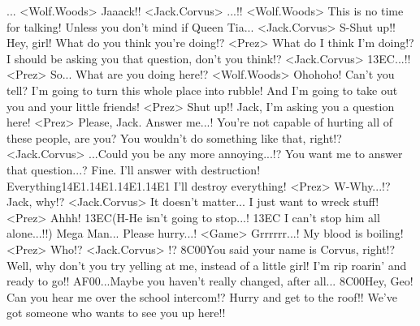 ... 
<Wolf.Woods> Jaaack!! 
<Jack.Corvus> ...!! 
<Wolf.Woods> This is no time for talking! 
Unless you don't mind if Queen Tia... 
<Jack.Corvus> S-Shut up!! 
Hey, girl! What do you think you're doing!? 
<Prez> What do I think I'm doing!? 
I should be asking you that question, don't you think!? 
<Jack.Corvus> {13}{EC}...!! 
<Prez> So... What are you doing here!? 
<Wolf.Woods> Ohohoho! 
Can't you tell? I'm going to turn this whole place into rubble! 
And I'm going to take out you and your little friends! 
<Prez> Shut up!! 
Jack, I'm asking you a question here! 
<Prez> Please, Jack. Answer me...! 
You're not capable of hurting all of these people, are you? 
You wouldn't do something like that, right!? 
<Jack.Corvus> ...Could you be any more annoying...!? 
You want me to answer that question...? 
Fine. 
I'll answer with destruction! 
Everything{14}{E1}.{14}{E1}.{14}{E1}.{14}{E1} I'll destroy everything! 
<Prez> W-Why...!? Jack, why!? 
<Jack.Corvus> It doesn't matter... 
I just want to wreck stuff! 
<Prez> Ahhh! 
{13}{EC}(H-He isn't going to stop...! {13}{EC} I can't stop him all alone...!!) 
Mega Man... 
Please hurry...! 
<Game> Grrrrrr...! My blood is boiling! 
<Prez> Who!? 
<Jack.Corvus> !? 
{8C}{00}You said your name is Corvus, right!? 
Well, why don't you try yelling at me, instead of a little girl! 
I'm rip roarin' and ready to go!! 
{AF}{00}...Maybe you haven't really changed, after all... 
{8C}{00}Hey, Geo! Can you hear me over the school intercom!? 
Hurry and get to the roof!! 
We've got someone who wants to see you up here!! 
